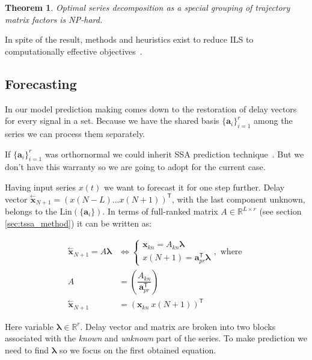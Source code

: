 \documentclass[referee, pdflatex, sn-mathphys-num]{sn-jnl}
\theoremstyle{definition}
\theoremstyle{plain}
\newtheorem{Th}{Theorem}
\newcommand{\delayV}[1]{\overset{\leftarrow}{\mathbf{x}}_{#1}}
\begin{document}
	\begin{Th}
		Optimal series decomposition as a special grouping of trajectory matrix factors is NP-hard.
	\end{Th}
	
	In spite of the result, methods and heuristics exist to reduce ILS to computationally effective objectives~\cite{Grafarend2022}.
	
	\subsection{Forecasting}\label{sec:tssa_forecast}
	
	In our model prediction making comes down to the restoration of delay vectors for every signal in a set. Because we have the shared basis $ \{\mathbf{a}_i\}_{i = 1}^r $ among the series we can process them separately. 
	
	If $ \{\mathbf{a}_i\}_{i = 1}^r $ was orthornormal we could inherit SSA prediction technique~\cite{ecfb9dc578be43ae9ee8fc88b8ff9151}. But we don't have this warranty so we are going to adopt for the current case.
	
	Having input series $ x(t) $ we want to forecast it for one step further. Delay vector $ \delayV{N + 1} = (x(N - L) \ldots x(N + 1))^{\mathsf{T}} $, with the last component unknown, belongs to the $ \text{Lin}(\{\mathbf{a}_i\}) $. In terms of full-ranked matrix $ A \in \mathbb{R}^{L \times r} $ (see section \ref{sec:tssa_method}) it can be written as:
	
	\begin{align}\label{eq:main_pred_for_A}
		\delayV{N + 1} = A \boldsymbol{\lambda} &\Leftrightarrow \begin{cases}
			\mathbf{x}_{kn} = A_{kn} \boldsymbol{\lambda}  \\
			x(N + 1) = \mathbf{a}_{pr}^{\mathsf{T}} \boldsymbol{\lambda}
		\end{cases}, \text{ where } \\
		A &= \left( \dfrac{A_{kn}}{\mathbf{a}_{pr}^{\mathsf{T}}} \right) \nonumber \\
		\delayV{N + 1} &= (\mathbf{x}_{kn} \  x(N + 1))^{\mathsf{T}} \nonumber
	\end{align}
	
	Here variable $ \boldsymbol{\lambda} \in \mathbb{R}^r $. Delay vector and matrix are broken into two blocks associated with the \emph{known} and \emph{unknown} part of the series. To make prediction we need to find $ \boldsymbol{\lambda} $ so we focus on the first obtained equation.
	
\end{document}

